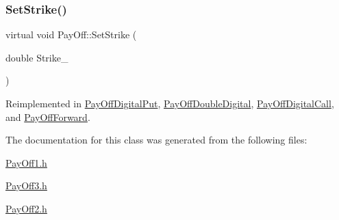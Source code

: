 \hypertarget{classPayOff_a3fdefed95df90a057acfd697f5703e04}{}\label{classPayOff_a3fdefed95df90a057acfd697f5703e04} 
\subsubsection{\texorpdfstring{Set\+Strike()}{SetStrike()}}
{\footnotesize\ttfamily virtual void Pay\+Off\+::\+Set\+Strike (\begin{DoxyParamCaption}\item[{double}]{Strike\+\_\+ }\end{DoxyParamCaption})\hspace{0.3cm}{\ttfamily [virtual]}}



Reimplemented in \hyperlink{classPayOffDigitalPut_aaf343c40b07b7405d192416ce23b00a8}{Pay\+Off\+Digital\+Put}, \hyperlink{classPayOffDoubleDigital_a2c0474c7433e29ca53a156086d1ac47b}{Pay\+Off\+Double\+Digital}, \hyperlink{classPayOffDigitalCall_a9f491f0704d09a233af8bb49c4eaed9e}{Pay\+Off\+Digital\+Call}, and \hyperlink{classPayOffForward_a3c0f3d6400d4d8fb0339edfca3d5b2bb}{Pay\+Off\+Forward}.



The documentation for this class was generated from the following files\+:\begin{DoxyCompactItemize}
\item 
\hyperlink{PayOff1_8h}{Pay\+Off1.\+h}\item 
\hyperlink{PayOff3_8h}{Pay\+Off3.\+h}\item 
\hyperlink{PayOff2_8h}{Pay\+Off2.\+h}\end{DoxyCompactItemize}
